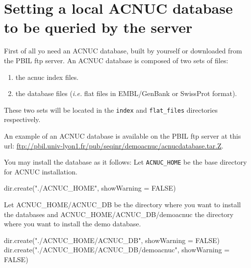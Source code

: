 \documentclass{article}
\begin{document}
\section{Setting a local ACNUC database to be queried by the server}

First of all yo need an ACNUC database, built by yourself or  downloaded from the PBIL ftp server.
An ACNUC database is composed of two sets of files:
\begin{enumerate}
	\item  the acnuc index files.
	\item  the database files (\textit{i.e.} flat files in EMBL/GenBank or SwissProt format).
\end{enumerate}

These two sets will be located  in the \texttt{index} and  \texttt{flat\_files} directories  respectively.

An example of an ACNUC database is available on the PBIL ftp server  at this url:
\url{ftp://pbil.univ-lyon1.fr/pub/seqinr/demoacnuc/acnucdatabase.tar.Z}.
 
You may install the database as it follows:
Let \texttt{ACNUC\_HOME} be the base directory for ACNUC installation.

\begin{Schunk}
\begin{Sinput}
 dir.create("./ACNUC_HOME", showWarning = FALSE)
\end{Sinput}
\end{Schunk}


Let ACNUC\_HOME/ACNUC\_DB be the  directory where you want to install the databases and ACNUC\_HOME/ACNUC\_DB/demoacnuc 
the directory where you want to install the demo database.

\begin{Schunk}
\begin{Sinput}
 dir.create("./ACNUC_HOME/ACNUC_DB", showWarning = FALSE)
 dir.create("./ACNUC_HOME/ACNUC_DB/demoacnuc", showWarning = FALSE)
\end{Sinput}
\end{Schunk}
\end{document}
